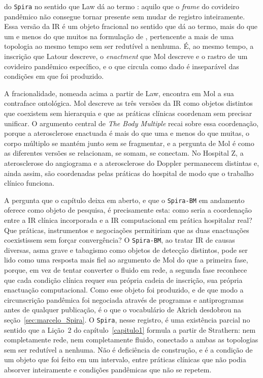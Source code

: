 do \texttt{Spira} no sentido que Law dá ao termo \parencite[pp.~83--85]{Law2004After}: aquilo que o \textit{frame} do covideiro pandêmico não consegue tornar presente sem mudar de registro inteiramente. Essa versão da IR é um objeto fracional no sentido que \textcite{Law2001Aircraft} dá ao termo, mais do que um e menos do que muitos na formulação de \textcite{mol2002body}, pertencente a mais de uma topologia ao mesmo tempo sem ser redutível a nenhuma. É, ao mesmo tempo, a inscrição que Latour descreve, o \textit{enactment} que Mol descreve e o rastro de um covideiro pandêmico específico, e o que circula como dado é inseparável das condições em que foi produzido.

A fracionalidade, nomeada acima a partir de Law, encontra em Mol a sua contraface ontológica. Mol descreve as três versões da IR como objetos distintos que coexistem sem hierarquia e que as práticas clínicas coordenam sem precisar unificar. O argumento central de \textit{The Body Multiple} recai sobre essa coordenação, porque a aterosclerose enactuada é mais do que uma e menos do que muitas, o corpo múltiplo se mantém junto sem se fragmentar, e a pergunta de Mol é como as diferentes versões se relacionam, se somam, se conectam. No Hospital Z, a aterosclerose do angiograma e a aterosclerose do Doppler permanecem distintas e, ainda assim, são coordenadas pelas práticas do hospital de modo que o trabalho clínico funciona.

A pergunta que o capítulo deixa em aberto, e que o \texttt{Spira-BM} em andamento oferece como objeto de pesquisa, é precisamente esta: como seria a coordenação entre a IR clínica incorporada e a IR computacional em prática hospitalar real? Que práticas, instrumentos e negociações permitiriam que as duas enactuações coexistissem sem forçar convergência? O \texttt{Spira-BM}, ao tratar IR de causas diversas, asma grave e tabagismo como objetos de detecção distintos, pode ser lido como uma resposta mais fiel ao argumento de Mol do que a primeira fase, porque, em vez de tentar converter o fluido em rede, a segunda fase reconhece que cada condição clínica requer sua própria cadeia de inscrição, sua própria enactuação computacional. Como esse objeto foi produzido, e de que modo a circunscrição pandêmica foi negociada através de programas e antiprogramas antes de qualquer publicação, é o que o vocabulário de Akrich desdobrou na seção~\ref{sec:marcelo_Spira}. O \texttt{Spira}, nesse registro, é uma existência parcial no sentido que a Lição~2 do capítulo~\ref{capitulo1} formula a partir de Strathern: nem completamente rede, nem completamente fluido, conectado a ambas as topologias sem ser redutível a nenhuma. Não é deficiência de construção, e é a condição de um objeto que foi feito em um intervalo, entre práticas clínicas que não podia absorver inteiramente e condições pandêmicas que não se repetem.

